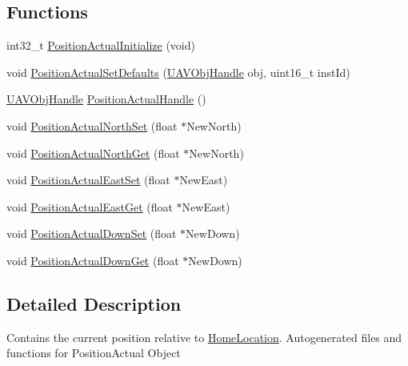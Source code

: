 \subsection*{\-Functions}
\begin{DoxyCompactItemize}
\item 
int32\-\_\-t \hyperlink{group___position_actual_ga2cd7966da0ffc3a7c5a64e5ec4725649}{\-Position\-Actual\-Initialize} (void)
\item 
void \hyperlink{group___position_actual_gac429414909a855dd5b1253c4f7d96d30}{\-Position\-Actual\-Set\-Defaults} (\hyperlink{targets_2_u_a_v_objects_2inc_2uavobjectmanager_8h_a279053e22be53ce9f895043aaeb91e3b}{\-U\-A\-V\-Obj\-Handle} obj, uint16\-\_\-t inst\-Id)
\item 
\hyperlink{targets_2_u_a_v_objects_2inc_2uavobjectmanager_8h_a279053e22be53ce9f895043aaeb91e3b}{\-U\-A\-V\-Obj\-Handle} \hyperlink{group___position_actual_ga7901f41c81545474821af6cf880f514a}{\-Position\-Actual\-Handle} ()
\item 
void \hyperlink{group___position_actual_gaa4aa8c205fce0d0985fcfdf4eeac0929}{\-Position\-Actual\-North\-Set} (float $\ast$\-New\-North)
\item 
void \hyperlink{group___position_actual_gaba1ce1101862fed3a19402959e602e4c}{\-Position\-Actual\-North\-Get} (float $\ast$\-New\-North)
\item 
void \hyperlink{group___position_actual_ga486f116553df432e54998f3184e502ec}{\-Position\-Actual\-East\-Set} (float $\ast$\-New\-East)
\item 
void \hyperlink{group___position_actual_ga57dc96e2cf18285a33d0a620f1becbfa}{\-Position\-Actual\-East\-Get} (float $\ast$\-New\-East)
\item 
void \hyperlink{group___position_actual_gaf7a79128855a898b1ef9304a156f00c7}{\-Position\-Actual\-Down\-Set} (float $\ast$\-New\-Down)
\item 
void \hyperlink{group___position_actual_ga4f9b8a08e5801e512be587403b65a483}{\-Position\-Actual\-Down\-Get} (float $\ast$\-New\-Down)
\end{DoxyCompactItemize}


\subsection{\-Detailed \-Description}
\-Contains the current position relative to \hyperlink{group___home_location}{\-Home\-Location}. \-Autogenerated files and functions for \-Position\-Actual \-Object 


